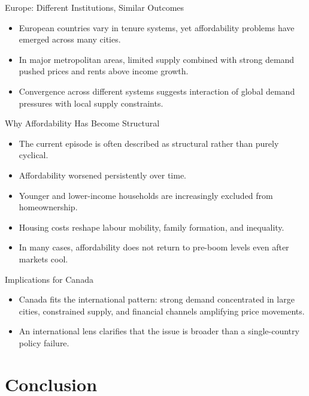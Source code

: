 \documentclass[aspectratio=169]{beamer}
\begin{document}
\begin{frame}{Europe: Different Institutions, Similar Outcomes}
\transfade
\begin{itemize}[<+->]
  \item European countries vary in tenure systems, yet affordability problems have emerged across many cities.
  \item In major metropolitan areas, limited supply combined with strong demand pushed prices and rents above income growth.
  \item Convergence across different systems suggests interaction of global demand pressures with local supply constraints.
\end{itemize}
\end{frame}

\begin{frame}{Why Affordability Has Become Structural}
\transfade
\begin{itemize}[<+->]
  \item The current episode is often described as structural rather than purely cyclical.
  \item Affordability worsened persistently over time.
  \item Younger and lower-income households are increasingly excluded from homeownership.
  \item Housing costs reshape labour mobility, family formation, and inequality.
  \item In many cases, affordability does not return to pre-boom levels even after markets cool.
\end{itemize}
\end{frame}

\begin{frame}{Implications for Canada}
\transfade
\begin{itemize}[<+->]
  \item Canada fits the international pattern: strong demand concentrated in large cities, constrained supply, and financial channels amplifying price movements.
  \item An international lens clarifies that the issue is broader than a single-country policy failure.
\end{itemize}
\end{frame}

\section{Conclusion}
\end{document}
